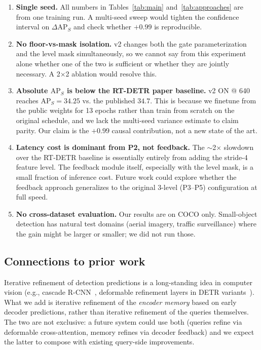 \begin{enumerate}
    \item \textbf{Single seed.} All numbers in Tables~\ref{tab:main} and~\ref{tab:approaches} are from one training run. A multi-seed sweep would tighten the confidence interval on $\Delta\mathrm{AP}_S$ and check whether $+0.99$ is reproducible.
    \item \textbf{No floor-vs-mask isolation.} v2 changes both the gate parameterization and the level mask simultaneously, so we cannot say from this experiment alone whether one of the two is sufficient or whether they are jointly necessary. A 2$\times$2 ablation would resolve this.
    \item \textbf{Absolute $\mathrm{AP}_S$ is below the RT-DETR paper baseline.} v2 ON @ 640 reaches $\mathrm{AP}_S = 34.25$ vs. the published $34.7$. This is because we finetune from the public weights for 13 epochs rather than train from scratch on the original schedule, and we lack the multi-seed variance estimate to claim parity. Our claim is the $+0.99$ causal contribution, not a new state of the art.
    \item \textbf{Latency cost is dominant from P2, not feedback.} The $\sim$2$\times$ slowdown over the RT-DETR baseline is essentially entirely from adding the stride-4 feature level. The feedback module itself, especially with the level mask, is a small fraction of inference cost. Future work could explore whether the feedback approach generalizes to the original 3-level (P3--P5) configuration at full speed.
    \item \textbf{No cross-dataset evaluation.} Our results are on COCO only. Small-object detection has natural test domains (aerial imagery, traffic surveillance) where the gain might be larger or smaller; we did not run those.
\end{enumerate}

\subsection{Connections to prior work}

Iterative refinement of detection predictions is a long-standing idea in computer vision (e.g., cascade R-CNN~\cite{cai2018cascade}, deformable refinement layers in DETR variants~\cite{zhu2021deformable,liu2022dabdetr}). What we add is iterative refinement of the \emph{encoder memory} based on early decoder predictions, rather than iterative refinement of the queries themselves. The two are not exclusive: a future system could use both (queries refine via deformable cross-attention, memory refines via decoder feedback) and we expect the latter to compose with existing query-side improvements.

